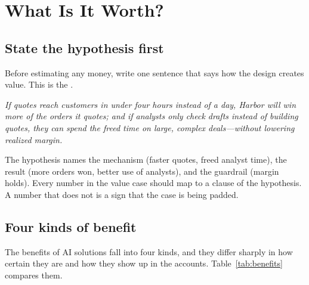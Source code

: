 
\section{What Is It Worth?}
\label{sec:value-case}

\subsection{State the hypothesis first}

Before estimating any money, write one sentence that says how the design creates value. This is the .

\begin{keyidea}
\emph{If quotes reach customers in under four hours instead of a day, Harbor will win more of the orders it quotes; and if analysts only check drafts instead of building quotes, they can spend the freed time on large, complex deals---without lowering realized margin.}
\end{keyidea}

The hypothesis names the mechanism (faster quotes, freed analyst time), the result (more orders won, better use of analysts), and the guardrail (margin holds). Every number in the value case should map to a clause of the hypothesis. A number that does not is a sign that the case is being padded.

\subsection{Four kinds of benefit}

The benefits of AI solutions fall into four kinds, and they differ sharply in how certain they are and how they show up in the accounts. Table~\ref{tab:benefits} compares them.


